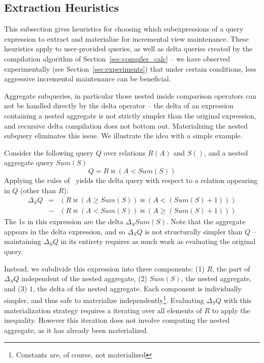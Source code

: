 \subsection{Extraction Heuristics}
\label{sec:advanced-rewriting}

This subsection gives heuristics for choosing which subexpressions of
a query expression to extract and materialize for incremental view maintenance.  These heuristics apply to user-provided queries, as well as delta queries created by the compilation algorithm of Section~\ref{sec:compiler_calc} -- we have observed experimentally (see Section~\ref{sec:experiments}) that under certain conditions, less aggressive incremental maintenance can be beneficial.

Aggregate subqueries, in particular those nested inside comparison operators can not be handled directly by the delta operator -- the delta of an expression containing a nested aggregate is not strictly simpler than the original expression, and recursive delta compilation does not bottom out.  Materializing the nested subquery eliminates this issue.  We illustrate the idea with a simple example.

\begin{example}
Consider the following query $Q$ over relations $R(A)$ and $S()$, and a nested aggregate query $Sum(S)$
{\small $$Q = R \bowtie (A < Sum(S))$$}
Applying the rules of~\cite{koch-pods:10} yields the delta query with respect to a relation appearing in $Q$ (other than $R$):
{\small \begin{eqnarray*}
\Delta_SQ & =  & (R \bowtie (A \geq Sum(S)) \bowtie (A < (Sum(S) +1)))\\
&-& (R \bowtie (A <  Sum(S)) \bowtie (A \geq (Sum(S) + 1)))
\end{eqnarray*}}
The 1s in this expression are the delta $\Delta_S Sum(S)$.  Note that the aggregate appears in the delta expression, and so $\Delta_SQ$ is not structurally simpler than $Q$ -- maintaining $\Delta_S Q$ in its entirety requires as much work as evaluating the original query.  

Instead, we subdivide this expression into three components: (1) $R$, the part of $\Delta_S Q$ independent of the nested aggregate, (2) $Sum(S)$, the nested aggregate, and (3) $1$, the delta of the nested aggregate.  Each component is individually simpler, and thus safe to materialize independently\footnote{Constants are, of course, not materialized}.  Evaluating $\Delta_S Q$ with this materialization strategy requires a iterating over all elements of $R$ to apply the inequality.  However this iteration does not involve computing the nested aggregate, as it has already been materialized.
\end{example}

